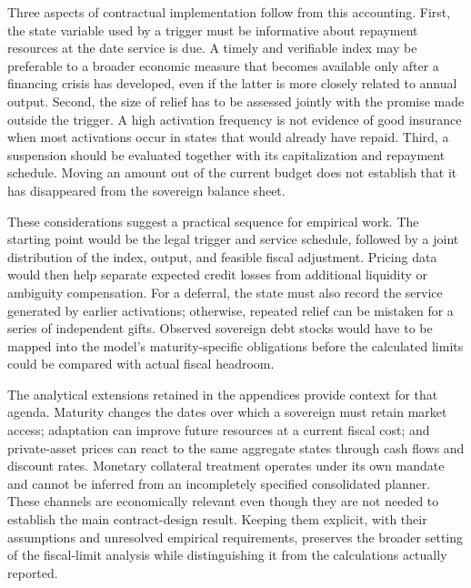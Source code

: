 Three aspects of contractual implementation follow from this accounting. First, the state variable used by a trigger must be informative about repayment resources at the date service is due. A timely and verifiable index may be preferable to a broader economic measure that becomes available only after a financing crisis has developed, even if the latter is more closely related to annual output. Second, the size of relief has to be assessed jointly with the promise made outside the trigger. A high activation frequency is not evidence of good insurance when most activations occur in states that would already have repaid. Third, a suspension should be evaluated together with its capitalization and repayment schedule. Moving an amount out of the current budget does not establish that it has disappeared from the sovereign balance sheet.

These considerations suggest a practical sequence for empirical work. The starting point would be the legal trigger and service schedule, followed by a joint distribution of the index, output, and feasible fiscal adjustment. Pricing data would then help separate expected credit losses from additional liquidity or ambiguity compensation. For a deferral, the state must also record the service generated by earlier activations; otherwise, repeated relief can be mistaken for a series of independent gifts. Observed sovereign debt stocks would have to be mapped into the model's maturity-specific obligations before the calculated limits could be compared with actual fiscal headroom.

The analytical extensions retained in the appendices provide context for that agenda. Maturity changes the dates over which a sovereign must retain market access; adaptation can improve future resources at a current fiscal cost; and private-asset prices can react to the same aggregate states through cash flows and discount rates. Monetary collateral treatment operates under its own mandate and cannot be inferred from an incompletely specified consolidated planner. These channels are economically relevant even though they are not needed to establish the main contract-design result. Keeping them explicit, with their assumptions and unresolved empirical requirements, preserves the broader setting of the fiscal-limit analysis while distinguishing it from the calculations actually reported.
